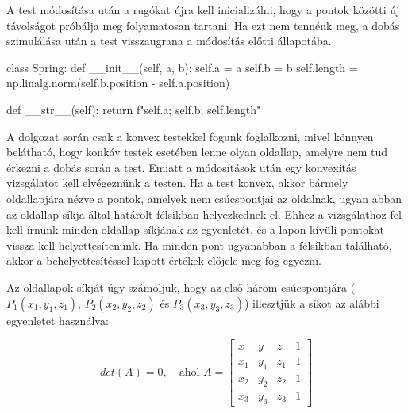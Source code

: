 A test módosítása után a rugókat újra kell inicializálni, hogy a pontok közötti új távolságot próbálja meg folyamatosan tartani.
Ha ezt nem tennénk meg, a dobás szimulálása után a test visszaugrana a módosítás előtti állapotába.

\begin{python}
class Spring:
    def __init__(self, a, b):
        self.a = a
        self.b = b
        self.length = np.linalg.norm(self.b.position - self.a.position)
	
    def __str__(self):
        return f"{self.a}; {self.b}; {self.length}"
\end{python}


A dolgozat során csak a konvex testekkel fogunk foglalkozni, mivel könnyen belátható, hogy konkáv testek esetében lenne olyan oldallap, amelyre nem tud érkezni a dobás során a test.
Emiatt a módosítások után egy konvexitás vizsgálatot kell elvégeznünk a testen.
Ha a test konvex, akkor bármely oldallapjára nézve a pontok, amelyek nem csúcspontjai az oldalnak, ugyan abban az oldallap síkja által határolt félsíkban helyezkednek el.
Ehhez a vizsgálathoz fel kell írnunk minden oldallap síkjának az egyenletét, és a lapon kívüli pontokat vissza kell helyettesítenünk.
Ha minden pont ugyanabban a félsíkban található, akkor a behelyettesítéssel kapott értékek előjele meg fog egyezni.

Az oldallapok síkját úgy számoljuk, hogy az első három csúcspontjára ($P_1(x_1, y_1, z_1)$, $P_2(x_2, y_2, z_2)$ és $P_3(x_3, y_3, z_3)$) illesztjük a síkot az alábbi egyenletet használva:

\[
det(A)=0,\quad \text{ahol } A = 
\begin{bmatrix}
	x & y & z & 1 \\
	x_1 & y_1 & z_1 & 1 \\
	x_2 & y_2 & z_2 & 1 \\
	x_3 & y_3 & z_3 & 1
\end{bmatrix}
\]

